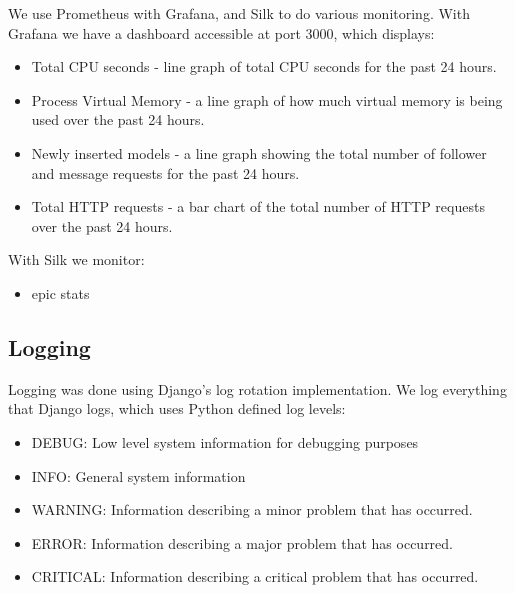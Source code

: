 We use Prometheus with Grafana, and Silk to do various monitoring. With Grafana we have a dashboard accessible at port 3000, which displays:
\begin{itemize}
    \item Total CPU seconds - line graph of total CPU seconds for the past 24 hours.
    \item Process Virtual Memory - a line graph of how much virtual memory is being used over the past 24 hours.
    \item Newly inserted models - a line graph showing the total number of follower and message requests for the past 24 hours.
    \item Total HTTP requests - a bar chart of the total number of HTTP requests over the past 24 hours.
\end{itemize}

With Silk we monitor:

\begin{itemize}
    \item epic stats
\end{itemize}

\subsection{Logging}

Logging was done using Django's log rotation implementation. We log everything that Django logs, which uses Python defined log levels:

\begin{itemize}
    \item DEBUG: Low level system information for debugging purposes
    \item INFO: General system information
    \item WARNING: Information describing a minor problem that has occurred.
    \item ERROR: Information describing a major problem that has occurred.
    \item CRITICAL: Information describing a critical problem that has occurred.
\end{itemize}

